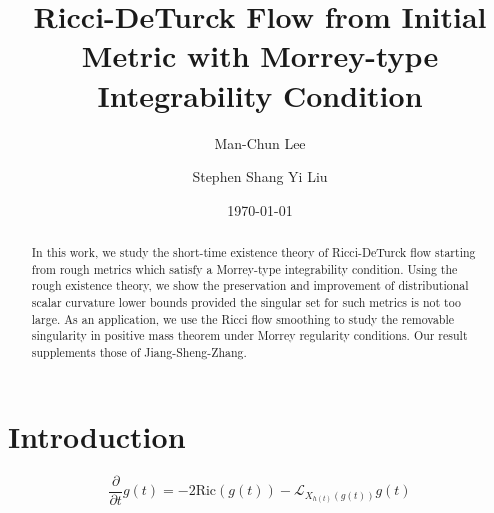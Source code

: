 \documentclass[12pt]{amsart}
\theoremstyle{remark}
\numberwithin{equation}{section}
\begin{document}
\title[]
{Ricci-DeTurck Flow from Initial Metric with Morrey-type Integrability Condition}

\author{Man-Chun Lee}
\address[Man-Chun Lee]{Room 237, Lady Shaw Building,
The Chinese University of Hong Kong,
Shatin, N.T., Hong Kong}

\author{Stephen Shang Yi Liu}
\address[Stephen Shang Yi Liu]{Room 222A, Lady Shaw Building,
The Chinese University of Hong Kong,
Shatin, N.T., Hong Kong}

\renewcommand{\subjclassname}{
  \textup{2010} Mathematics Subject Classification}

\date{\today}


\begin{abstract}
In this work, we study the short-time existence theory of Ricci-DeTurck flow starting from rough metrics which satisfy a Morrey-type integrability condition. Using the rough existence theory, we show the preservation and improvement of distributional scalar curvature lower bounds  provided the singular set for such metrics is not too large. As an application, we use the Ricci flow smoothing to study the removable singularity in positive mass theorem under Morrey regularity conditions. Our result supplements those of Jiang-Sheng-Zhang.
\end{abstract}


\maketitle




\section{Introduction}\label{sec:introduction}

\begin{equation}\label{eqn:prelim-ricci-deturck-flow}
    \frac{\partial}{\partial t} g(t) = -2\text{Ric}(g(t)) - \mathcal{L}_{X_{h(t)}(g(t))}g(t)
\end{equation}
\end{document}

